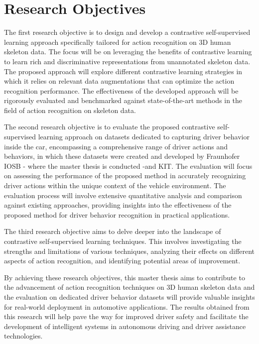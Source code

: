 \section{Research Objectives}
The first research objective is to design and develop a contrastive self-supervised learning approach specifically tailored for action recognition on 3D human skeleton data. The focus will be on leveraging the benefits of contrastive learning to learn rich and discriminative representations from unannotated skeleton data. The proposed approach will explore different contrastive learning strategies in which it relies on relevant data augmentations that can optimize the action recognition performance. The effectiveness of the developed approach will be rigorously evaluated and benchmarked against state-of-the-art methods in the field of action recognition on skeleton data.

The second research objective is to evaluate the proposed contrastive self-supervised learning approach on datasets dedicated to capturing driver behavior inside the car, encompassing a comprehensive range of driver actions and behaviors, in which these datasets were created and developed by Fraunhofer IOSB - where the master thesis is conducted -and KIT.  The evaluation will focus on assessing the performance of the proposed method in accurately recognizing driver actions within the unique context of the vehicle environment. The evaluation process will involve extensive quantitative analysis and comparison against existing approaches, providing insights into the effectiveness of the proposed method for driver behavior recognition in practical applications.

The third research objective aims to delve deeper into the landscape of contrastive self-supervised learning techniques. This involves investigating the strengths and limitations of various techniques, analyzing their effects on different aspects of action recognition, and identifying potential areas of improvement.

By achieving these research objectives, this master thesis aims to contribute to the advancement of action recognition techniques on 3D human skeleton data and the evaluation on dedicated driver behavior datasets will provide valuable insights for real-world deployment in automotive applications. The results obtained from this research will help pave the way for improved driver safety and facilitate the development of intelligent systems in autonomous driving and driver assistance technologies.

